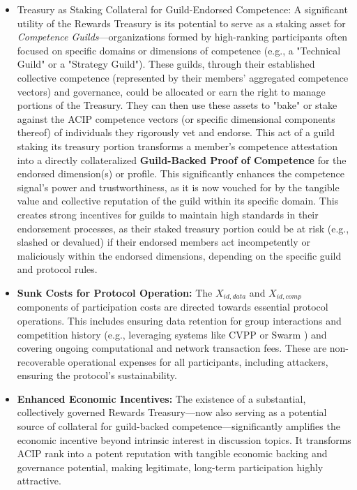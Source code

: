 \documentclass{article}
\begin{document}
\begin{CJK}{UTF8}{gbsn}
\begin{itemize}
        \item Treasury as Staking Collateral for Guild-Endorsed Competence: A significant utility of the Rewards Treasury is its potential to serve as a staking asset for \textit{Competence Guilds}—organizations formed by high-ranking participants often focused on specific domains or dimensions of competence (e.g., a "Technical Guild" or a "Strategy Guild"). These guilds, through their established collective competence (represented by their members' aggregated competence vectors) and governance, could be allocated or earn the right to manage portions of the Treasury. They can then use these assets to "bake" or stake against the ACIP competence vectors (or specific dimensional components thereof) of individuals they rigorously vet and endorse. This act of a guild staking its treasury portion transforms a member's competence attestation into a directly collateralized \textbf{Guild-Backed Proof of Competence} for the endorsed dimension(s) or profile. This significantly enhances the competence signal's power and trustworthiness, as it is now vouched for by the tangible value and collective reputation of the guild within its specific domain. This creates strong incentives for guilds to maintain high standards in their endorsement processes, as their staked treasury portion could be at risk (e.g., slashed or devalued) if their endorsed members act incompetently or maliciously within the endorsed dimensions, depending on the specific guild and protocol rules.

        \item \textbf{Sunk Costs for Protocol Operation:} The $X_{id,data}$ and $X_{id,comp}$ components of participation costs are directed towards essential protocol operations. This includes ensuring data retention for group interactions and competition history (e.g., leveraging systems like CVPP \cite{cvpp} or Swarm \cite{swarm}) and covering ongoing computational and network transaction fees. These are non-recoverable operational expenses for all participants, including attackers, ensuring the protocol's sustainability.

        \item \textbf{Enhanced Economic Incentives:} The existence of a substantial, collectively governed Rewards Treasury—now also serving as a potential source of collateral for guild-backed competence—significantly amplifies the economic incentive beyond intrinsic interest in discussion topics. It transforms ACIP rank into a potent reputation with tangible economic backing and governance potential, making legitimate, long-term participation highly attractive.


\end{itemize}
\end{CJK}
\end{document}
